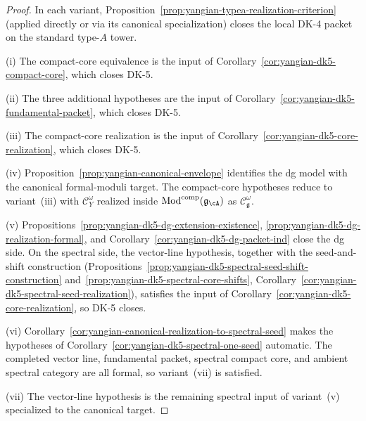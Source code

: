 \begin{proof}
In each variant, Proposition~\ref{prop:yangian-typea-realization-criterion}
(applied directly or via its canonical specialization) closes the local
DK-4 packet on the standard type-$A$ tower.

\textup{(i)}
The compact-core equivalence is the input of
Corollary~\ref{cor:yangian-dk5-compact-core}, which closes DK-5.

\textup{(ii)}
The three additional hypotheses are the input of
Corollary~\ref{cor:yangian-dk5-fundamental-packet}, which closes DK-5.

\textup{(iii)}
The compact-core realization is the input of
Corollary~\ref{cor:yangian-dk5-core-realization}, which closes DK-5.

\textup{(iv)}
Proposition~\ref{prop:yangian-canonical-envelope} identifies the dg
model with the canonical formal-moduli target.  The compact-core
hypotheses reduce to variant~\textup{(iii)} with
$\mathcal{C}_Y^\omega$ realized inside
$\operatorname{Mod}^{\mathrm{comp}}(\mathfrak{g}_{\cA})$ as
$\mathcal{C}_{\mathfrak g}^\omega$.

\textup{(v)}
Propositions~\ref{prop:yangian-dk5-dg-extension-existence},
\ref{prop:yangian-dk5-dg-realization-formal}, and
Corollary~\ref{cor:yangian-dk5-dg-packet-ind} close the dg side.
On the spectral side, the vector-line hypothesis, together with
the seed-and-shift construction
(Propositions~\ref{prop:yangian-dk5-spectral-seed-shift-construction}
and~\ref{prop:yangian-dk5-spectral-core-shifts},
Corollary~\ref{cor:yangian-dk5-spectral-seed-realization}), satisfies
the input of Corollary~\ref{cor:yangian-dk5-core-realization}, so
DK-5 closes.

\textup{(vi)}
Corollary~\ref{cor:yangian-canonical-realization-to-spectral-seed}
makes the hypotheses of
Corollary~\ref{cor:yangian-dk5-spectral-one-seed} automatic.  The
completed vector line, fundamental packet, spectral compact core, and
ambient spectral category are all formal, so
variant~\textup{(vii)} is satisfied.

\textup{(vii)}
The vector-line hypothesis is the remaining spectral input of
variant~\textup{(v)} specialized to the canonical target.
\end{proof}


